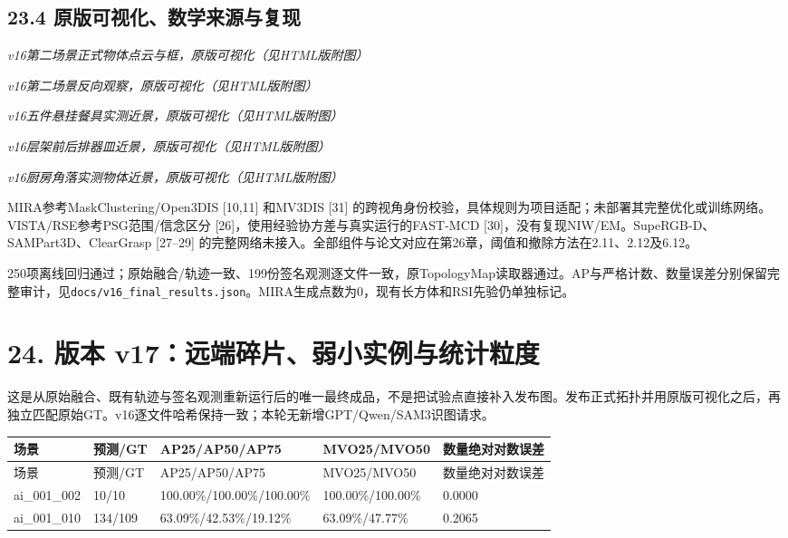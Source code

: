 \documentclass[UTF8,fontset=fandol]{ctexart}
\begin{document}
\subsection*{23.4 原版可视化、数学来源与复现}

\textit{v16第二场景正式物体点云与框，原版可视化（见HTML版附图）}



\textit{v16第二场景反向观察，原版可视化（见HTML版附图）}



\textit{v16五件悬挂餐具实测近景，原版可视化（见HTML版附图）}



\textit{v16层架前后排器皿近景，原版可视化（见HTML版附图）}



\textit{v16厨房角落实测物体近景，原版可视化（见HTML版附图）}



MIRA参考MaskClustering/Open3DIS [10,11] 和MV3DIS [31] 的跨视角身份校验，具体规则为项目适配；未部署其完整优化或训练网络。VISTA/RSE参考PSG范围/信念区分 [26]，使用经验协方差与真实运行的FAST-MCD [30]，没有复现NIW/EM。SupeRGB-D、SAMPart3D、ClearGrasp [27–29] 的完整网络未接入。全部组件与论文对应在第26章，阈值和撤除方法在2.11、2.12及6.12。



250项离线回归通过；原始融合/轨迹一致、199份签名观测逐文件一致，原TopologyMap读取器通过。AP与严格计数、数量误差分别保留完整审计，见\texttt{docs/\allowbreak{}v16\_\allowbreak{}final\_\allowbreak{}results.\allowbreak{}json}。MIRA生成点数为0，现有长方体和RSI先验仍单独标记。



\section*{24. 版本 v17：远端碎片、弱小实例与统计粒度}

这是从原始融合、既有轨迹与签名观测重新运行后的唯一最终成品，不是把试验点直接补入发布图。发布正式拓扑并用原版可视化之后，再独立匹配原始GT。v16逐文件哈希保持一致；本轮无新增GPT/Qwen/SAM3识图请求。



{\small
\begin{longtable}{|p{}|p{}|p{}|p{}|p{}|}
\hline
场景 & 预测/GT & AP25/AP50/AP75 & MVO25/MVO50 & 数量绝对对数误差 \\ \hline
\endfirsthead
\hline
场景 & 预测/GT & AP25/AP50/AP75 & MVO25/MVO50 & 数量绝对对数误差 \\ \hline
\endhead
ai\_001\_002 & 10/10 & 100.00\%/100.00\%/100.00\% & 100.00\%/100.00\% & 0.0000 \\ \hline
ai\_001\_010 & 134/109 & 63.09\%/42.53\%/19.12\% & 63.09\%/47.77\% & 0.2065 \\ \hline
\end{longtable}
}
\end{document}
